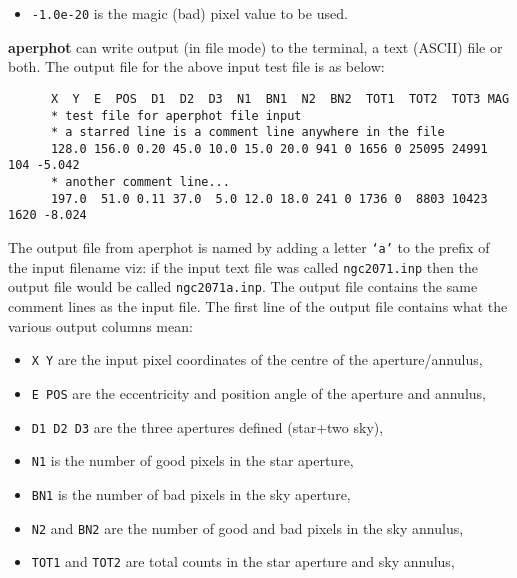 \begin{description}
\begin{itemize}
\item {\tt -1.0e-20} is the magic (bad) pixel value to be used.

\end{itemize}

{\bf aperphot} can write output (in file mode) to the terminal, a text
(ASCII) file or both.  The output file for the above input test file is
as below:

\begin{small}
\begin{verbatim} 
      X  Y  E  POS  D1  D2  D3  N1  BN1  N2  BN2  TOT1  TOT2  TOT3 MAG 
      * test file for aperphot file input 
      * a starred line is a comment line anywhere in the file 
      128.0 156.0 0.20 45.0 10.0 15.0 20.0 941 0 1656 0 25095 24991  104 -5.042 
      * another comment line... 
      197.0  51.0 0.11 37.0  5.0 12.0 18.0 241 0 1736 0  8803 10423 1620 -8.024 
\end{verbatim} 
\end{small}

The output file from aperphot is named by adding a letter {\tt `a'} to the
prefix of the input filename viz: if the input text file was called
{\tt ngc2071.inp} then the output file would be called {\tt ngc2071a.inp}.
The output file contains the same comment lines as the input file.  The 
first line of the output file contains what the various output columns mean:

\begin{itemize}

\item {\tt X Y} are the input pixel coordinates of the centre of the
aperture/annulus, 

\item {\tt E POS} are the eccentricity and position angle of the
aperture and annulus, 

\item {\tt D1 D2 D3} are the three apertures defined (star+two sky), 

\item {\tt N1} is the number of good pixels in the star aperture, 

\item {\tt BN1} is the number of bad pixels in the sky aperture,

\item {\tt N2} and {\tt BN2} are the number of good and bad pixels in
the sky annulus,

\item {\tt TOT1} and {\tt TOT2} are total counts in
the star aperture and sky annulus, 


\end{itemize}
\end{description}
